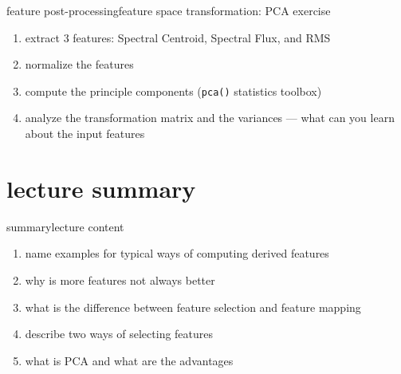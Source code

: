 		\begin{frame}{feature post-processing}{feature space transformation: PCA exercise}
                \begin{enumerate}
                    \item   extract 3 features: Spectral Centroid, Spectral Flux, and RMS
                    \item   normalize the features
                    \item   compute the principle components (\texttt{pca()} statistics toolbox)
                    \item   analyze the transformation matrix and the variances --- what can you learn about the input features
                \end{enumerate}
		\end{frame}

    \section[summary]{lecture summary}
        \begin{frame}{summary}{lecture content}
            \begin{enumerate}
                \item   name examples for typical ways of computing derived features      
                \smallskip
                \item<2->   why is more features not always better
                \smallskip
                \item<3->   what is the difference between feature selection and feature mapping
                \smallskip
                \item<4->   describe two ways of selecting features
                \smallskip
                \item<5->   what is PCA and what are the advantages
            \end{enumerate}
        \end{frame}


